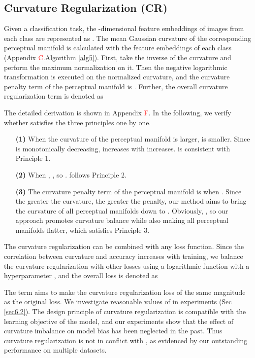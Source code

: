 \documentclass[10pt,twocolumn,letterpaper]{article}
\begin{document}
\subsection{Curvature Regularization (CR)}
\label{sec5.2}

Given a  classification task, the -dimensional feature embeddings of images from each class are represented as . The mean Gaussian curvature  of the corresponding perceptual manifold is calculated with the feature embeddings of each class (Appendix \textcolor{red}{C}.Algorithm \ref{alg5}). First, take the inverse of the curvature  and perform the maximum normalization on it. Then the negative logarithmic transformation is executed on the normalized curvature, and the curvature penalty term of the perceptual manifold  is . Further, the overall curvature regularization term is denoted as 

The detailed derivation is shown in Appendix \textcolor{red}{F}. In the following, we verify whether  satisfies the three principles one by one.

\begin{itemize}
\item[\textbf{(1)}] When the curvature  of the perceptual manifold is larger,  is smaller. Since  is monotonically decreasing,  increases with  increases.  is consistent with Principle 1.

\item[\textbf{(2)}] When , , so .  follows Principle 2.

\item[\textbf{(3)}] The curvature penalty term of the perceptual manifold  is  when . Since the greater the curvature, the greater the penalty, our method aims to bring the curvature of all perceptual manifolds down to . Obviously, , so our approach promotes curvature balance while also making all perceptual manifolds flatter, which satisfies Principle 3.
\end{itemize}

The curvature regularization can be combined with any loss function. Since the correlation between curvature and accuracy increases with training, we balance the curvature regularization with other losses using a logarithmic function with a hyperparameter , and the overall loss is denoted as
\begin{small}

\end{small}

The term  aims to make the curvature regularization loss of the same magnitude as the original loss. We investigate reasonable values of  in experiments (Sec \ref{sec6.2}). The design principle of curvature regularization is compatible with the learning objective of the model, and our experiments show that the effect of curvature imbalance on model bias has been neglected in the past. Thus curvature regularization is not in conflict with , as evidenced by our outstanding performance on multiple datasets.
\end{document}
